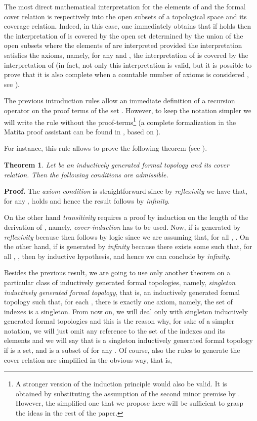 \documentclass[copyright,creativecommons]{eptcs}
\newtheorem{theorem}[definition]{Theorem}
\begin{document}
The most direct mathematical interpretation for the elements of  and the formal cover 
relation is respectively into the open subsets of a topological space and its 
coverage relation.
Indeed, in this case, one immediately obtains that if  holds then the interpretation
of  is covered by the open set determined by the union of the open subsets where the elements
of  are interpreted provided the interpretation satisfies the axioms, namely, for any  
and , the interpretation of  is covered by the interpretation of  
(in fact, not only this interpretation is valid, but it is possible to prove that it is also complete when 
a countable number of axioms is considered , see \cite{Val06}).

The previous introduction rules allow an immediate definition of a recursion operator
on the proof terms of the set .
However, to keep the notation simpler we will write the rule without the 
proof-terms\footnote{A stronger version of the induction principle would also be valid. It is obtained by substituting the assumption of the second 
minor premise by
.
However, the simplified one that we propose here will be 
sufficient to grasp the ideas in the rest of the paper.}
(a complete formalization in the Matita proof assistant can be found in \cite{Sac10}, 
based on \cite{Tas10}).


For instance, this rule allows to prove the following theorem (see \cite{TIG}).

\begin{theorem}
\label{thTransitivity}
Let  be an inductively generated formal topology and  its cover relation.
Then the following conditions are admissible.

\end{theorem}
{\bf Proof.}
The {\em axiom condition} is straightforward since by {\em reflexivity} we have that, for any ,
 holds and hence the result follows by {\em infinity}.

On the other hand {\em transitivity} requires a proof by induction on the length of the derivation of 
, namely, {\em cover-induction} has to be used.
Now, if  is generated by {\em reflexivity} because  then  
follows by logic since we are assuming that, for all , .
On the other hand, if  is generated by {\em infinity} because there exists some 
 such that, for all , , then by inductive hypothesis, 
 and hence we can conclude  by {\em infinity}.
\medskip

Besides the previous result, we are going to use only another theorem on a particular class of
inductively generated formal topologies, namely, {\em singleton inductively generated formal topology}, 
that is, an inductively generated formal topology such that, for each , there is exactly one 
axiom, namely, the set of indexes  is a singleton.
From now on, we will deal only with singleton inductively generated formal topologies and this 
is the reason why, for sake of a simpler notation, we will just omit any reference to the set of the 
indexes and its elements and we will say that  is a singleton inductively generated formal 
topology if  is a set, and  is a subset of  for any .
Of course, also the rules to generate the cover relation are simplified in the obvious way, that is,
\end{document}
